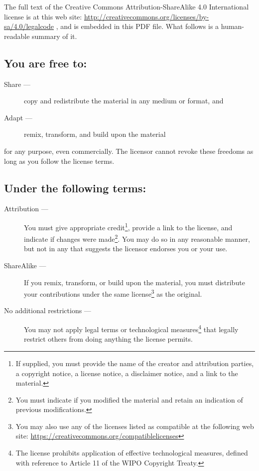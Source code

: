 \documentclass[letterpaper,twoside]{article}
\begin{document}
The full text of the Creative Commons Attribution-ShareAlike 4.0
International license is at this web site:
\url{http://creativecommons.org/licenses/by-sa/4.0/legalcode}%
, and is embedded in this
PDF file.  What follows is a human-readable summary of it.

\subsection{You are free to:}
\begin{description}
\item[Share ---]copy and redistribute the material in any medium or format, and
\item[Adapt ---]remix, transform, and build upon the material
\end{description}
for any purpose, even commercially.  The licensor cannot revoke these
freedoms as long as you follow the license terms.
\subsection{Under the following terms:}
\begin{description}
\item[Attribution ---]You must give appropriate credit\footnote{If supplied,
  you must provide the name of the creator and attribution parties,
  a copyright notice, a license notice, a disclaimer notice, and a link
  to the material.}, provide a link to
  the license, and indicate if changes were made\footnote{You must indicate if
    you modified the material and retain an indication of previous
    modifications.}.  You may do so in any
  reasonable manner, but not in any that suggests the licensor endorses you
  or your use.
\item[ShareAlike ---]If you remix, transform, or build upon the material,
  you must distribute your contributions under the same
  license\footnote{You may also use any of the licenses listed as compatible
    at the following web site:
    \url{https://creativecommons.org/compatiblelicenses}}
  as the original.
\item[No additional restrictions ---]You may not apply legal terms or
  technological measures\footnote{The license prohibits application of
    effective technological measures, defined with reference to Article 11
    of the WIPO Copyright Treaty.}
  that legally restrict others from doing anything
  the license permits.
\end{description}
\end{document}
